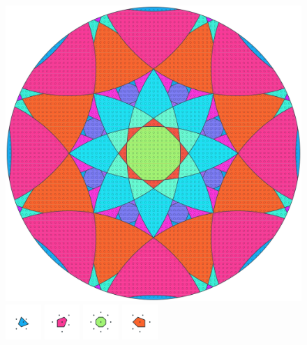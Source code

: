 \documentclass[text.tex]{subfiles}
\begin{document}
\clearpage
\pagestyle{fancy}
\fancyhf{}
\begin{figure}[h!]
\centering
\includegraphics[width=1\textwidth]{img/results/circle8/circle8_122503_(2273_-941alpha_1).pdf}
\includegraphics[width=0.12\textwidth]{img/results/circle8/circle8_122503_(2273_-941alpha_1)_001.pdf}
\includegraphics[width=0.12\textwidth]{img/results/circle8/circle8_122503_(2273_-941alpha_1)_002.pdf}
\includegraphics[width=0.12\textwidth]{img/results/circle8/circle8_122503_(2273_-941alpha_1)_003.pdf}
\includegraphics[width=0.12\textwidth]{img/results/circle8/circle8_122503_(2273_-941alpha_1)_004.pdf}

\end{figure}
\end{document}
